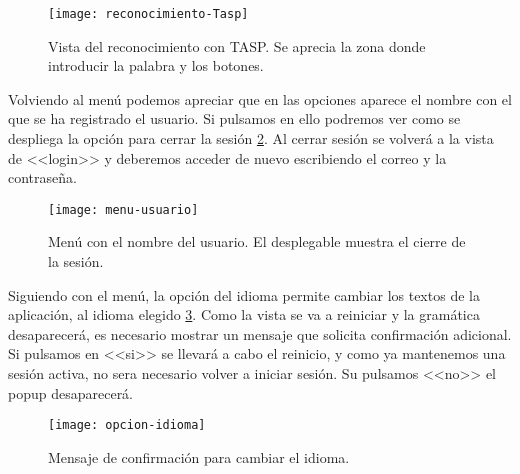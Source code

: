 \begin{figure}[h]
\centering
\texttt{[image: reconocimiento-Tasp]}
\caption{Vista del reconocimiento con TASP. Se aprecia la zona donde introducir la palabra y los botones.}
\label{fig:6.9}
\end{figure}

Volviendo al menú podemos apreciar que en las opciones aparece el nombre con el que se ha registrado el usuario. Si pulsamos en ello podremos ver como se despliega la opción para cerrar la sesión \ref{fig:6.10}. Al cerrar sesión se volverá a la vista de <<login>> y deberemos acceder de nuevo escribiendo el correo y la contraseña.

\begin{figure}[h]
\centering
\texttt{[image: menu-usuario]}
\caption{Menú con el nombre del usuario. El desplegable muestra el cierre de la sesión.}
\label{fig:6.10}
\end{figure}

Siguiendo con el menú, la opción del idioma permite cambiar los textos de la aplicación, al idioma elegido \ref{fig:6.11}. Como la vista se va a reiniciar y la gramática desaparecerá, es necesario mostrar un mensaje que solicita confirmación adicional. Si pulsamos en <<si>> se llevará a cabo el reinicio, y como ya mantenemos una sesión activa, no sera necesario volver a iniciar sesión. Su pulsamos <<no>> el popup desaparecerá.

\begin{figure}[h]
\centering
\texttt{[image: opcion-idioma]}
\caption{Mensaje de confirmación para cambiar el idioma.}
\label{fig:6.11}
\end{figure}

